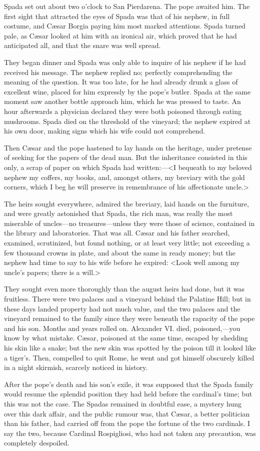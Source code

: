 {Spada set out about two o'clock to San Pierdarena. The pope awaited him. The first sight that attracted the eyes of Spada was that of his nephew, in full costume, and Cæsar Borgia paying him most marked attentions. Spada turned pale, as Cæsar looked at him with an ironical air, which proved that he had anticipated all, and that the snare was well spread. 

They began dinner and Spada was only able to inquire of his nephew if he had received his message. The nephew replied no; perfectly comprehending the meaning of the question. It was too late, for he had already drunk a glass of excellent wine, placed for him expressly by the pope's butler. Spada at the same moment saw another bottle approach him, which he was pressed to taste. An hour afterwards a physician declared they were both poisoned through eating mushrooms. Spada died on the threshold of the vineyard; the nephew expired at his own door, making signs which his wife could not comprehend. 

Then Cæsar and the pope hastened to lay hands on the heritage, under pretense of seeking for the papers of the dead man. But the inheritance consisted in this only, a scrap of paper on which Spada had written:—<I bequeath to my beloved nephew my coffers, my books, and, amongst others, my breviary with the gold corners, which I beg he will preserve in remembrance of his affectionate uncle.> 

The heirs sought everywhere, admired the breviary, laid hands on the furniture, and were greatly astonished that Spada, the rich man, was really the most miserable of uncles—no treasures—unless they were those of science, contained in the library and laboratories. That was all. Cæsar and his father searched, examined, scrutinized, but found nothing, or at least very little; not exceeding a few thousand crowns in plate, and about the same in ready money; but the nephew had time to say to his wife before he expired: <Look well among my uncle's papers; there is a will.> 

They sought even more thoroughly than the august heirs had done, but it was fruitless. There were two palaces and a vineyard behind the Palatine Hill; but in these days landed property had not much value, and the two palaces and the vineyard remained to the family since they were beneath the rapacity of the pope and his son. Months and years rolled on. Alexander VI. died, poisoned,—you know by what mistake. Cæsar, poisoned at the same time, escaped by shedding his skin like a snake; but the new skin was spotted by the poison till it looked like a tiger's. Then, compelled to quit Rome, he went and got himself obscurely killed in a night skirmish, scarcely noticed in history. 

After the pope's death and his son's exile, it was supposed that the Spada family would resume the splendid position they had held before the cardinal's time; but this was not the case. The Spadas remained in doubtful ease, a mystery hung over this dark affair, and the public rumour was, that Cæsar, a better politician than his father, had carried off from the pope the fortune of the two cardinals. I say the two, because Cardinal Rospigliosi, who had not taken any precaution, was completely despoiled.}

